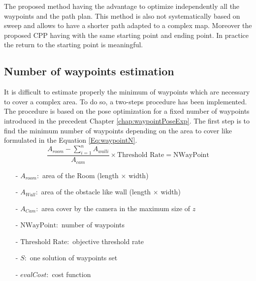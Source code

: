 The proposed method having the advantage to optimize independently all the waypoints and the path plan. This method is also not systematically based on sweep and allows to have a shorter path adapted to a complex map. Moreover the proposed CPP having with the same starting point and ending point. In practice the return to the starting point is meaningful. 


\subsection{Number of waypoints estimation}\label{sec:NmbWaypoint}

It is difficult to estimate properly the minimum of waypoints which are necessary to cover a complex area.
To do so, a two-steps procedure has been implemented. The procedure is based on the pose optimization for a fixed number of waypoints introduced in the precedent Chapter \ref{chap:waypointPoseExp}. 
The first step is to find the minimum number of waypoints depending on the area to cover like formulated in the
 Equation \ref{Eq:waypointN}. \\
\begin{equation}\label{Eq:waypointN}
\frac{ A_{room} - \sum_{i=1}^n A_{wall i} }{A_{cam}} \times \mbox{Threshold Rate} = \mbox{NWayPoint}
\end{equation}

\begin{itemize}
\item[-] $ A_{room}: $  area of the Room (length $\times$ width)
\item[-] $ A_{Wall}: $  area of the obstacle like wall (length $\times$ width)
\item[-] $ A_{Cam}: $   area cover by the camera in the maximum size of $z$
\item[-] $ \mbox{NWayPoint}: $  number of waypoints
\item[-] $ \mbox{Threshold Rate}: $ objective threshold rate 
\item[-] $S:$ one solution of waypoints set 
\item[-] $evalCost:$ cost function  
\end{itemize}

